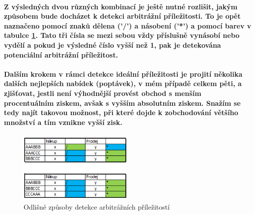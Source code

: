 \documentclass[thesis=B,czech]{FITthesis}[2019/03/21]
\begin{document}
\paragraph{
Z výsledných dvou různých kombinací je ještě nutné rozlišit, jakým způsobem bude docházet k detekci arbitrážní příležitosti. To je opět naznačeno pomocí znaků dělena ('/') a násobení ('*') a pomocí barev v tabulce \ref{2_kombinace}. Tato tři čísla se mezi sebou vždy příslušně vynásobí nebo vydělí a pokud je výsledné číslo vyšší než 1, pak je detekována potenciální arbitrážní příležitost. 
}
\paragraph{
Dalším krokem v rámci detekce ideální příležitosti je projití několika dalších nejlepších nabídek (poptávek), v mém případě celkem pěti, a zjišťovat, jestli není výhodnější provést obchod s menším procentuálním ziskem, avšak s vyšším absolutním ziskem. Snažím se tedy najít takovou možnost, při které dojde k zobchodování většího množství a tím vznikne vyšší zisk.
}

\begin{figure}\centering
	\includegraphics[width=0.5\textwidth]{images/2_kombinace.PNG}
	\caption{Odlišné způsoby detekce arbitrážních příležitostí}\label{2_kombinace}
\end{figure}
\end{document}
